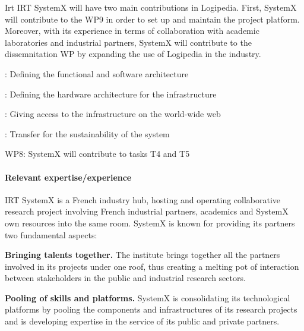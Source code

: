 \begin{sitedescription}{Irt}
IRT SystemX will have two main contributions in Logipedia. First, SystemX will contribute to the WP9 in order to set up and maintain the project platform. Moreover, with its experience in terms of collaboration with academic laboratories and industrial partners, SystemX will contribute to the dissemnitation WP by expanding the use of Logipedia in the industry.






\begin{compactitem}
\item {} : Defining the functional and software architecture
\item {} : Defining the hardware architecture for the infrastructure
\item {} : Giving access to the infrastructure on the world-wide web
\item {} : Transfer for the sustainability of the system
\item WP8: SystemX will contribute to tasks T4 and T5
\end{compactitem}




\paragraph{Relevant expertise/experience}

IRT SystemX is a French industry hub, hosting and operating collaborative research project involving French industrial partners, academics and SystemX own resources into the same room. SystemX is known for providing its partners two fundamental aspects:

\begin{compactitem}
\item {\bf Bringing talents together.} The institute brings together all the partners involved in its projects under one roof, thus creating a melting pot of interaction between stakeholders in the public and industrial research sectors.
\item {\bf Pooling of skills and platforms.} SystemX is consolidating its technological platforms by pooling the components and infrastructures of its research projects and is developing expertise in the service of its public and private partners.
\end{compactitem}





\end{sitedescription}
